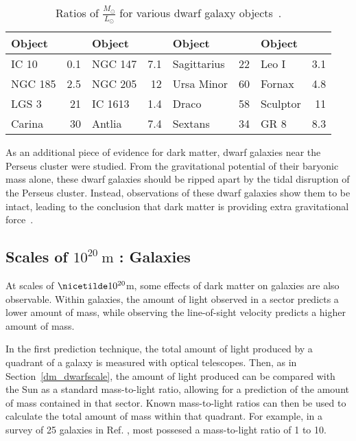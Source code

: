 \begin{table}[h]
  \centering
  \caption[Ratios of $\frac{\textrm{M}_\odot}{\textrm{L}_\odot}$ for Various Dwarf Galaxy Objects]{
    Ratios of $\frac{M_\odot}{L_\odot}$ for various dwarf galaxy objects~\cite{localdwarfs}.
  }
  \label{tab:mlratios:dwarfgals}
  \begin{tabular}{l r | l r | l r | l r}
    Object      &  \mlratio{} & Object & \mlratio{} & Object & \mlratio{} & Object & \mlratio{} \\
    \hline
    IC 10       &  0.1 & NGC 147    &  7.1 & Sagittarius & 22 & Leo I    &  3.1 \\
    NGC 185     &  2.5 & NGC 205    & 12   & Ursa Minor  & 60 & Fornax   &  4.8 \\
    LGS 3       & 21   & IC 1613    &  1.4 & Draco       & 58 & Sculptor & 11   \\
    Carina      & 30   & Antlia     &  7.4 & Sextans     & 34 & GR 8     &  8.3 \\
  \end{tabular}
\end{table}
    
As an additional piece of evidence for dark matter, dwarf galaxies near the Perseus cluster were studied.
From the gravitational potential of their baryonic mass alone, these dwarf galaxies should be ripped apart by the tidal disruption of the Perseus cluster.
Instead, observations of these dwarf galaxies show them to be intact, leading to the conclusion that dark matter is providing extra gravitational force~\cite{Penny2009}.

\FloatBarrier

\subsection{Scales of $10^{20}\:\text{m}$ : Galaxies}\label{dm_gal}
%
At scales of $\nicetilde 10^{20}$m, some effects of dark matter on galaxies are also observable.
Within galaxies, the amount of light observed in a sector predicts a lower amount of mass, while observing the line-of-sight velocity predicts a higher amount of mass.

In the first prediction technique, the total amount of light produced by a quadrant of a galaxy is measured with optical telescopes.
Then, as in Section~\ref{dm_dwarfscale}, the amount of light produced can be compared with the Sun as a standard mass-to-light ratio, allowing for a prediction of the amount of mass contained in that sector.
Known mass-to-light ratios can then be used to calculate the total amount of mass within that quadrant.
For example, in a survey of 25 galaxies in Ref. \cite{galaxy_mass_light_ratio}, most possesed a mass-to-light ratio of 1 to 10.

